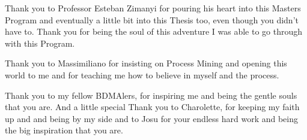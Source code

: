 Thank you to Professor Esteban Zimanyi for pouring his heart into this Masters Program and eventually a little bit into this Thesis too, even though you didn't have to. Thank you for being the soul of this adventure I was able to go through with this Program.

Thank you to Massimiliano for insisting on Process Mining and opening this world to me and for teaching me how to believe in myself and the process.

Thank you to my fellow BDMAlers, for inspiring me and being the gentle souls that you are.
And a little special Thank you to Charolette, for keeping my faith up and and being by my side and to Josu for your endless hard work and being the big inspiration that you are. 

